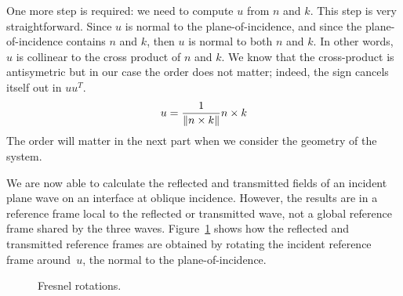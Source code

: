 One more step is required: we need to compute $u$ from $n$ and $k$.
This step is very straightforward.
Since $u$ is normal to the plane-of-incidence, and since the plane-of-incidence contains $n$ and $k$, then $u$ is normal to both $n$ and $k$.
In other words, $u$ is collinear to the cross product of $n$ and $k$.
We know that the cross-product is antisymetric but in our case the order does not matter; indeed, the sign cancels itself out in $u u^T$.
\begin{equation}
    u = \frac{1}{\left\| n \times k \right\|} n \times k
\end{equation}
The order will matter in the next part when we consider the geometry of the system.

We are now able to calculate the reflected and transmitted fields of an incident plane wave on an interface at oblique incidence.
However, the results are in a reference frame local to the reflected or transmitted wave, not a global reference frame shared by the three waves.
Figure~\ref{fig:fresnel_rotations} shows how the reflected and transmitted reference frames are obtained by rotating the incident reference frame around~$u$, the normal to the plane-of-incidence.
\begin{figure}[hbtp]
    \centering
    \caption{\label{fig:fresnel_rotations}Fresnel rotations.}
\end{figure}

